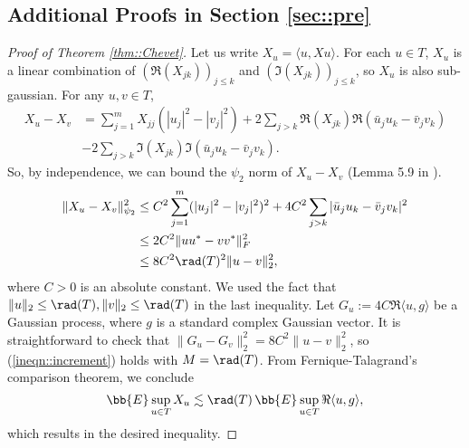 \documentclass[12pt]{article}%
\theoremstyle{plain}%
\theoremstyle{remark}
\begin{document}
\subsection{Additional Proofs in Section \ref{sec::pre}}
\begin{proof}[Proof of Theorem \ref{thm::Chevet}]
Let us write $X_u = \langle u, Xu \rangle$. For each $u \in T$, $X_u$ is a linear combination of $(\Re(X_{jk}))_{j \le k}$ and $(\Im(X_{jk}))_{j \le k}$, so $X_u$ is also sub-gaussian.  For any $u,v \in T$, 
\begin{align*}
X_u - X_v &= \sum_{j=1}^m X_{jj} ( | u_j |^2 - |v_j|^2 ) + 2\sum_{j > k} \Re(X_{jk}) \Re( \bar{u}_j u_k - \bar{v}_j v_k ) \\
& - 2\sum_{j > k} \Im(X_{jk}) \Im(\bar{u}_j  u_k - \bar{v}_j v_k).
\end{align*}
So, by independence, we can bound the $\psi_2$ norm of $X_u - X_v$ (Lemma 5.9 in \cite{Ver10}).
\begin{align*}
\| X_u - X_v \|_{\psi_2}^2 &\le C^2 \sum_{j=1}^m ( | u_j |^2 - |v_j|^2 )^2 + 4C^2 \sum_{j > k} | \bar{u}_j u_k - \bar{v}_j v_k |^2 \\
&\le 2C^2 \| uu^* - vv^* \|_F^2 \\
&\le 8C^2 \rad(T)^2 \| u - v \|_2^2,
\end{align*}
where $C>0$ is an absolute constant. We used the fact that $\| u \|_2 \le \rad(T), \| v \|_2 \le \rad(T)$ in the last inequality. Let $G_u := 4C \Re \langle u, g \rangle$ be a Gaussian process, where $g$ is a standard complex Gaussian vector. It is straightforward to check that $\| G_u - G_v \|_2^2 = 8C^2\|u - v\|_2^2$, so (\ref{ineqn::increment}) holds with $M=\rad(T)$. From Fernique-Talagrand's comparison theorem, we conclude 
\begin{equation*}
\bb{E} \sup_{u \in T} X_u \lesssim \rad(T) \, \bb{E} \sup_{u \in T} \Re \langle u, g \rangle,
\end{equation*}
which results in the desired inequality.
\end{proof}

~
\end{document}
